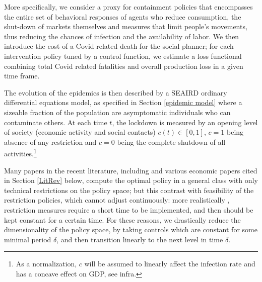 \documentclass{amsart}
\begin{document}
More specifically, we consider a proxy for containment policies that encompasses the entire set of behavioral responses of agents who reduce consumption, the shut-down of markets themselves and measures that limit
people's movements, thus reducing the chances of
infection and the availability of labor. We then introduce the cost of a Covid related death for the social planner; for each intervention policy tuned
by a control function, we estimate a loss functional combining 
total Covid related fatalities and overall production loss in a given time frame.

The evolution of the epidemics is then described by a SEAIRD 
ordinary differential equations model, as specified in 
Section \ref{epidemic model} where a sizeable fraction of the population are asymptomatic individuals who can contaminate others. At each time $t$,
the lockdown is measured by an opening level of society (economic activity and social contacts) $c(t)
\in [0,1]$, $c=1$ being absence of any restriction and 
$c=0$ being the complete shutdown of all activities.\footnote{As a normalization, $c$ will be assumed to linearly affect  the infection rate and has a concave effect on GDP, see infra.}  

Many papers in the recent literature, including \cite{GKK}
 and various economic papers cited in Section \ref{LitRev} below,
compute the optimal policy in a general class with only technical 
restrictions on the policy space; but
this contrast with feasibility of the restriction policies,
which cannot adjust continuously: more realistically \cite{YZ},
restriction measures require a short time to 
be implemented, and then should be kept constant
for a certain time. For these reasons, 
we drastically reduce the dimensionality of 
the policy space, by taking controls
which are constant for some minimal period $\overline \delta$, and then transition linearly to the next level
in time $\underline \delta$. 
\end{document}
